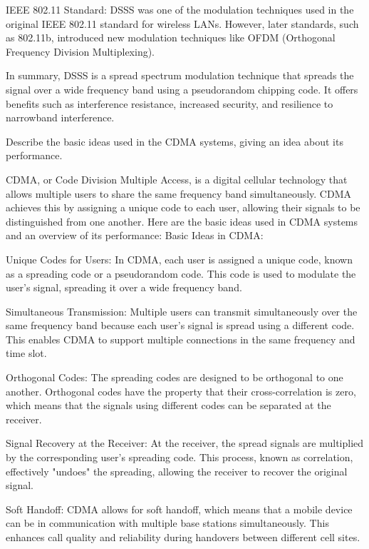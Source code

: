 IEEE 802.11 Standard:
DSSS was one of the modulation techniques used in the original IEEE 802.11 standard for wireless LANs. However, later standards, such as 802.11b, introduced new modulation techniques like OFDM (Orthogonal Frequency Division Multiplexing).

In summary, DSSS is a spread spectrum modulation technique that spreads the signal over a wide frequency band using a pseudorandom chipping code. It offers benefits such as interference resistance, increased security, and resilience to narrowband interference.





Describe the basic ideas used in the CDMA systems, giving an idea about its performance.

CDMA, or Code Division Multiple Access, is a digital cellular technology that allows multiple users to share the same frequency band simultaneously. CDMA achieves this by assigning a unique code to each user, allowing their signals to be distinguished from one another. Here are the basic ideas used in CDMA systems and an overview of its performance:
Basic Ideas in CDMA:

Unique Codes for Users:
In CDMA, each user is assigned a unique code, known as a spreading code or a pseudorandom code. This code is used to modulate the user's signal, spreading it over a wide frequency band.

Simultaneous Transmission:
Multiple users can transmit simultaneously over the same frequency band because each user's signal is spread using a different code. This enables CDMA to support multiple connections in the same frequency and time slot.

Orthogonal Codes:
The spreading codes are designed to be orthogonal to one another. Orthogonal codes have the property that their cross-correlation is zero, which means that the signals using different codes can be separated at the receiver.

Signal Recovery at the Receiver:
At the receiver, the spread signals are multiplied by the corresponding user's spreading code. This process, known as correlation, effectively "undoes" the spreading, allowing the receiver to recover the original signal.

Soft Handoff:
CDMA allows for soft handoff, which means that a mobile device can be in communication with multiple base stations simultaneously. This enhances call quality and reliability during handovers between different cell sites.

